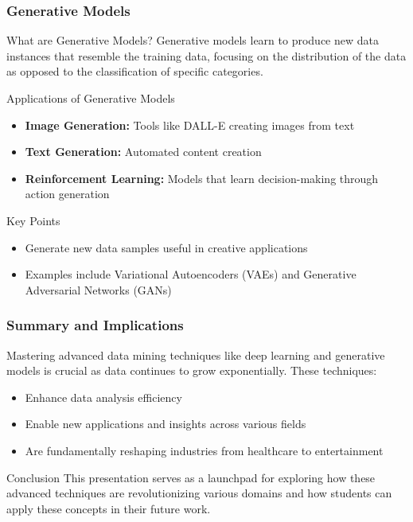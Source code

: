 \documentclass[aspectratio=169]{beamer}
\begin{document}
\begin{frame}[fragile]
    \frametitle{Generative Models}
    \begin{block}{What are Generative Models?}
        Generative models learn to produce new data instances that resemble the training data, focusing on the distribution of the data as opposed to the classification of specific categories.
    \end{block}

    \begin{block}{Applications of Generative Models}
        \begin{itemize}
            \item \textbf{Image Generation:} Tools like DALL-E creating images from text
            \item \textbf{Text Generation:} Automated content creation
            \item \textbf{Reinforcement Learning:} Models that learn decision-making through action generation
        \end{itemize}
    \end{block}

    \begin{block}{Key Points}
        \begin{itemize}
            \item Generate new data samples useful in creative applications
            \item Examples include Variational Autoencoders (VAEs) and Generative Adversarial Networks (GANs)
        \end{itemize}
    \end{block}
\end{frame}

\begin{frame}[fragile]
    \frametitle{Summary and Implications}
    Mastering advanced data mining techniques like deep learning and generative models is crucial as data continues to grow exponentially. These techniques:
    \begin{itemize}
        \item Enhance data analysis efficiency
        \item Enable new applications and insights across various fields
        \item Are fundamentally reshaping industries from healthcare to entertainment
    \end{itemize}

    \begin{block}{Conclusion}
        This presentation serves as a launchpad for exploring how these advanced techniques are revolutionizing various domains and how students can apply these concepts in their future work.
    \end{block}
\end{frame}
\end{document}
